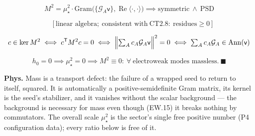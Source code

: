 \begin{theorem}
\[
M^2=\mu_\star^2\cdot\text{Gram}\bigl(\{\mathcal G_A\mathsf v\},\operatorname{Re}\langle\cdot,\cdot\rangle\bigr)\implies\text{symmetric}\ \wedge\ \text{PSD}
\]

\[
\quad [\text{linear algebra};\ \text{consistent with}\ \mathrm{CT2.8}:\ \text{residues}\ge0]
\]

\[
c\in\ker M^2\iff c^{\mathsf T}M^2c=0\iff\Bigl\|\textstyle\sum_Ac_A\mathcal G_A\mathsf v\Bigr\|^2=0\iff\textstyle\sum_Ac_A\mathcal G_A\in\operatorname{Ann}(\mathsf v)
\]

\[
h_0=0\implies\mu_\star^2=0\implies M^2\equiv0:\ \forall\ \text{electroweak modes massless}.\ \blacksquare
\]

\textbf{Phys.} Mass is a transport defect: the failure of a wrapped seed to return to itself, squared. It is automatically a positive-semidefinite Gram matrix, its kernel is the seed’s stabilizer, and it vanishes without the scalar background — the background is necessary for mass even though (EW.15) it breaks nothing by commutators. The overall scale $\mu_\star^2$ is the sector’s single free positive number (P4 configuration data); every ratio below is free of it.

\end{theorem}

